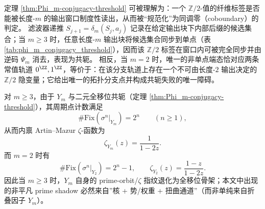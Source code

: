 \begin{remark}[可逆性阈值的同调解释：\(m=2\) 的唯一分支点对应不可消去的 \texorpdfstring{$\mathbb{Z}/2$}{Z/2} 隐变量]\label{rem:Phi_m-conjugacy-threshold-z2-homology}
定理 \ref{thm:Phi_m-conjugacy-threshold} 可被理解为：一个 \(\mathbb{Z}/2\)-值的纤维标签是否能被长度-\(m\) 的输出窗口制度性读出，从而被“规范化”为同调零（coboundary）的判定。
滤波器递推 \(S_{j+1}=\delta_m(S_j,a_j)\) 记录在给定输出块下内部后缀的候选集合；当 \(m\ge 3\) 时，任意长度-\(m\) 输出块将候选集合同步到单点（表 \ref{tab:phi_m_conjugacy_threshold}），因而该 \(\mathbb{Z}/2\) 标签在窗口内可被完全同步并由逆码 \(\Psi_m\) 消去，表现为共轭。
相反，当 \(m=2\) 时，唯一的非单点端态恰对应两条常值轨道 \(0^{\ZZ},1^{\ZZ}\)，等价于：在该分支轨道上存在一个不可由长度-\(2\) 输出决定的 \(\mathbb{Z}/2\) 隐变量；它给出唯一的拓扑分支点并构成共轭失败的唯一障碍。
\end{remark}

\begin{corollary}\label{cor:Phi_m-zeta-closed}
对 $m\ge 3$，由于 $Y_m$ 与二元全移位共轭（定理 \ref{thm:Phi_m-conjugacy-threshold}），其周期点计数满足
$$
\#\mathrm{Fix}(\sigma^n|_{Y_m})=2^n\qquad(n\ge 1),
$$
从而内禀 Artin--Mazur \(\zeta\)-函数为
$$
\zeta_{Y_m}(z)=\frac{1}{1-2z}.
$$
而 $m=2$ 时有
$$
\#\mathrm{Fix}(\sigma^n|_{Y_2})=2^n-1,\qquad
\zeta_{Y_2}(z)=\frac{1-z}{1-2z}.
$$
因此当 $m\ge 3$ 时，$Y_m$ 自身的 prime-orbit/\(\zeta\) 指纹退化为全移位骨架；本文中出现的非平凡 prime shadow 必然来自”核 + 势/权重 + 扭曲通道”（而非单纯来自折叠因子 $Y_m$）。
\end{corollary}
